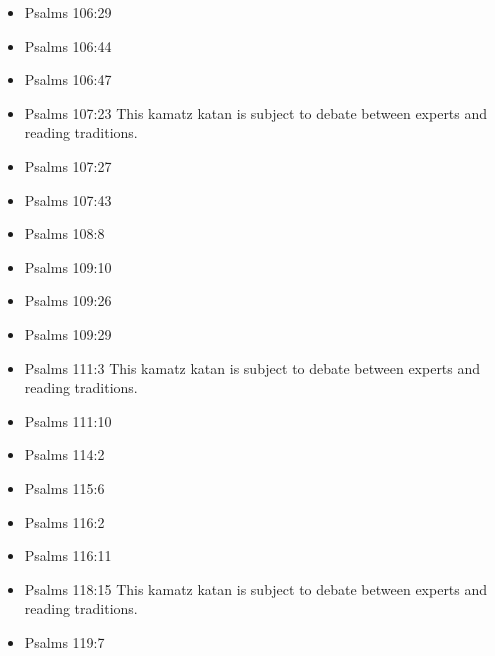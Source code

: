 \documentclass[14pt]{book}
\begin{document}
\begin{multicols}{2}
\begin{itemize}
					\item Psalms 106:29
					
					\item Psalms 106:44
					
					\item Psalms 106:47
					
					\item Psalms 107:23 This kamatz katan is subject to debate between experts and reading traditions.
					
					\item Psalms 107:27
					
					\item Psalms 107:43
							
							\item Psalms 108:8
							
							\item Psalms 109:10
							
							\item Psalms 109:26
							
							\item Psalms 109:29
							
							\item Psalms 111:3 This kamatz katan is subject to debate between experts and reading traditions.
							
							\item Psalms 111:10
							
							\item Psalms 114:2
							
							\item Psalms 115:6
							
							\item Psalms 116:2
							
							\item Psalms 116:11
						
							
							\item Psalms 118:15 This kamatz katan is subject to debate between experts and reading traditions.
							
							\item Psalms 119:7
							

\end{itemize}
\end{multicols}
\end{document}
